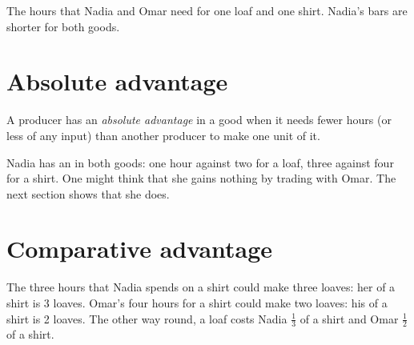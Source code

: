 \begin{omfigure}

{\small The hours that Nadia and Omar need for one loaf and one shirt. Nadia's bars are
shorter for both goods.}
\end{omfigure}

\section{Absolute advantage}

\begin{definition}\label{def:g7:comparative-advantage:absolute-advantage}
A producer has an \emph{absolute advantage} in a good when it
needs fewer hours (or less of any input) than another producer to make one unit of it.
\end{definition}

Nadia has an  in both goods: one hour against two for a loaf, three
against four for a shirt. One might think that she gains nothing by trading with Omar.
The next section shows that she does.

\section{Comparative advantage}

The three hours that Nadia spends on a shirt could make three loaves: her  of a shirt is 3 loaves. Omar's four hours for a shirt could make two loaves: his
 of a shirt is 2 loaves. The other way round, a loaf costs Nadia
$\tfrac13$ of a shirt and Omar $\tfrac12$ of a shirt.

